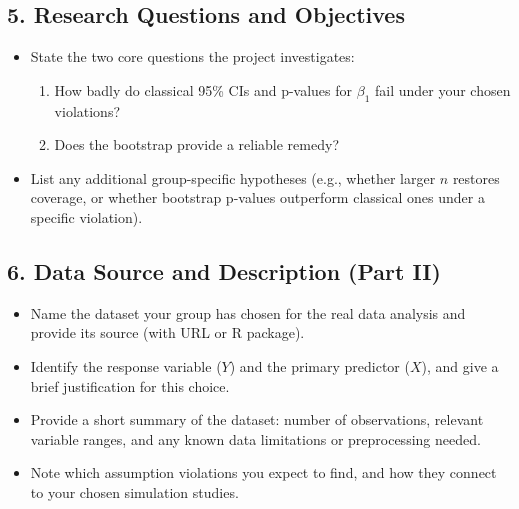 \documentclass[12pt]{article}
\begin{document}
\subsection*{5. Research Questions and Objectives}
\begin{itemize}
    \item State the two core questions the project investigates:
    \begin{enumerate}
        \item How badly do classical 95\% CIs and p-values for $\beta_1$ fail under your chosen violations?
        \item Does the bootstrap provide a reliable remedy?
    \end{enumerate}
    \item List any additional group-specific hypotheses (e.g., whether larger $n$ restores coverage, or whether bootstrap p-values outperform classical ones under a specific violation).
\end{itemize}
\subsection*{6. Data Source and Description (Part II)}
\begin{itemize}
    \item Name the dataset your group has chosen for the real data analysis and provide its source (with URL or R package).
    \item Identify the response variable ($Y$) and the primary predictor ($X$), and give a brief justification for this choice.
    \item Provide a short summary of the dataset: number of observations, relevant variable ranges, and any known data limitations or preprocessing needed.
    \item Note which assumption violations you expect to find, and how they connect to your chosen simulation studies.
\end{itemize}
\end{document}
